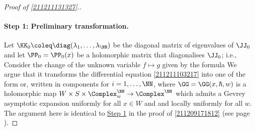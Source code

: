 \documentclass[11pt]{article}
\begin{document}
\begin{proof}[Proof of \autoref{211211131327}.]
\paragraph*{Step 1: Preliminary transformation.}
Let $\KK_0 \coleq \diag (\lambda_1, \ldots, \lambda_\NN)$ be the diagonal matrix of eigenvalues of $\JJ_0$ and let $\PP_0 = \PP_0 (x)$ be a holomorphic matrix that diagonalises $\JJ_0$; i.e., 
Consider the change of the unknown variable $f \mapsto g$ given by the formula
We argue that it transforms the differential equation \eqref{211211103217} into one of the form
or, written in components for $i = 1, \ldots, \NN$,
where $\GG = \GG (x, \hbar, w)$ is a holomorphic map $W \times S \times \Complex^\NN_w \to \Complex^\NN$ which admits a Gevrey asymptotic expansion
uniformly for all $x \in W$ and and locally uniformly for all $w$.
The argument here is identical to \hyperref[220110161323]{Step 1} in the proof of \autoref{211209171812} (see page \pageref{220110161323}).


\end{proof}
\end{document}

